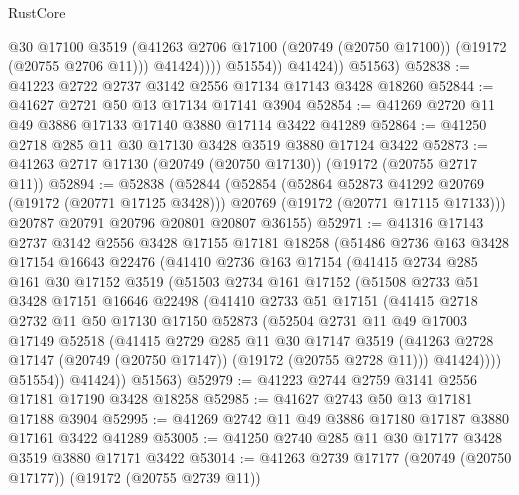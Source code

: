 \begin{lexlean}{RustCore}
\begin{coremodule}
                      @30
                      @17100
                      @3519
                      (@41263 @2706 @17100 (@20749 (@20750 @17100)) (@19172 (@20755 @2706 @11)))
                      @41424))))
              @51554))
          @41424))
      @51563)
@52838 := @41223 @2722 @2737 @3142 @2556 @17134 @17143 @3428 @18260
@52844 := @41627 @2721 @50 @13 @17134 @17141 @3904
@52854 := @41269 @2720 @11 @49 @3886 @17133 @17140 @3880 @17114 @3422 @41289
@52864 := @41250 @2718 @285 @11 @30 @17130 @3428 @3519 @3880 @17124 @3422
@52873 := @41263 @2717 @17130 (@20749 (@20750 @17130)) (@19172 (@20755 @2717 @11))
@52894 := @52838
    (@52844
      (@52854
        (@52864 @52873 @41292 @20769 (@19172 (@20771 @17125 @3428)))
        @20769
        (@19172 (@20771 @17115 @17133)))
      @20787
      @20791
      @20796
      @20801
      @20807
      @36155)
@52971 := @41316
    @17143
    @2737
    @3142
    @2556
    @3428
    @17155
    @17181
    @18258
    (@51486
      @2736
      @163
      @3428
      @17154
      @16643
      @22476
      (@41410
        @2736
        @163
        @17154
        (@41415
          @2734
          @285
          @161
          @30
          @17152
          @3519
          (@51503
            @2734
            @161
            @17152
            (@51508
              @2733
              @51
              @3428
              @17151
              @16646
              @22498
              (@41410
                @2733
                @51
                @17151
                (@41415
                  @2718
                  @2732
                  @11
                  @50
                  @17130
                  @17150
                  @52873
                  (@52504
                    @2731
                    @11
                    @49
                    @17003
                    @17149
                    @52518
                    (@41415
                      @2729
                      @285
                      @11
                      @30
                      @17147
                      @3519
                      (@41263 @2728 @17147 (@20749 (@20750 @17147)) (@19172 (@20755 @2728 @11)))
                      @41424))))
              @51554))
          @41424))
      @51563)
@52979 := @41223 @2744 @2759 @3141 @2556 @17181 @17190 @3428 @18258
@52985 := @41627 @2743 @50 @13 @17181 @17188 @3904
@52995 := @41269 @2742 @11 @49 @3886 @17180 @17187 @3880 @17161 @3422 @41289
@53005 := @41250 @2740 @285 @11 @30 @17177 @3428 @3519 @3880 @17171 @3422
@53014 := @41263 @2739 @17177 (@20749 (@20750 @17177)) (@19172 (@20755 @2739 @11))

\end{coremodule}
\end{lexlean}
